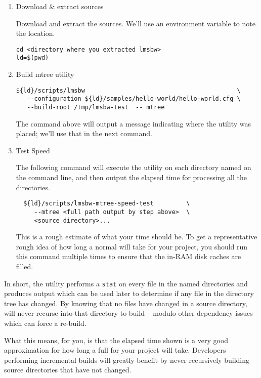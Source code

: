 \begin{enumerate}
\item Download \& extract \lmsbw sources

  Download and extract the sources.  We'll use an environment variable
  to note the location.

\begin{verbatim}
cd <directory where you extracted lmsbw>
ld=$(pwd)
\end{verbatim}
\item Build mtree utility
\begin{verbatim}
${ld}/scripts/lmsbw                                          \
   --configuration ${ld}/samples/hello-world/hello-world.cfg \
   --build-root /tmp/lmsbw-test  -- mtree
\end{verbatim}

The command above will output a message indicating where the \mtree
utility was placed; we'll use that in the next command.

\item Test Speed

  The following command will execute the \mtree utility on each
  directory named on the command line, and then output the elapsed
  time for processing all the directories.

\begin{verbatim}
  ${ld}/scripts/lmsbw-mtree-speed-test         \
     --mtree <full path output by step above>  \
     <source directory>...
\end{verbatim}

This is a rough estimate of what your \nullbuild time should be.  To
get a representative rough idea of how long a normal \nullbuild will
take for your project, you should run this command multiple times to
ensure that the in-RAM disk caches are filled.

\end{enumerate}

In short, the \mtree utility performs a \texttt{stat} on every file in
the named directories and produces output which can be used later to
determine if any file in the directory tree has changed.  By knowing
that no files have changed in a source directory, \lmsbw will never
recurse into that directory to build -- modulo other dependency issues
which can force a re-build.

What this means, for you, is that the elapsed time shown is a very
good approximation for how long a full \nullbuild for your project
will take.  Developers performing incremental builds will greatly
benefit by never recursively building source directories that have not
changed.


